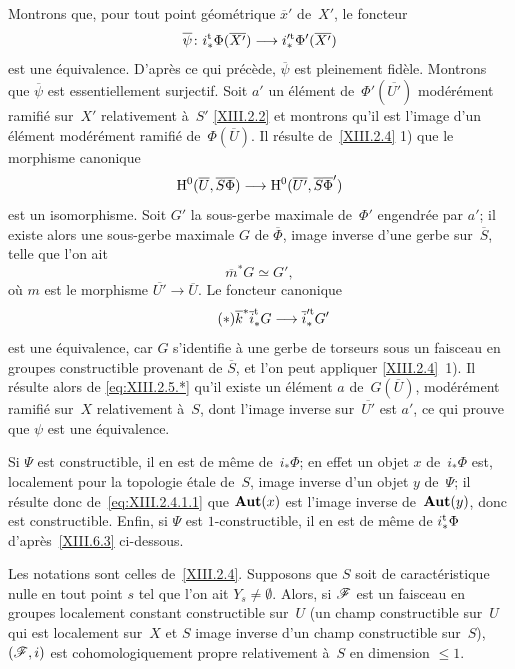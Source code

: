 Montrons
que, pour tout point g\'eom\'etrique $\overline{x}'$ de~$X'$, le
foncteur
$$
\overline{\psi}\colon i^{\tame}_*\Phi(\overline{X'})\to
i_*^{\prime\tame}\Phi'(\overline{X'})
$$
est une \'equivalence. D'apr\`es ce qui pr\'ec\`ede,
$\overline{\psi}$ est pleinement fid\`ele. Montrons que
$\overline{\psi}$ est essentiellement surjectif. Soit $a'$ un
\'el\'ement de~$\Phi'(\overline{U'})$ mod\'er\'ement
ramifi\'e sur~$X'$ relativement \`a~$S'$ \eqref{XIII.2.2} et
montrons qu'il est l'image d'un \'el\'ement mod\'er\'ement
ramifi\'e de~$\Phi(\overline{U})$. Il r\'esulte de~\ref{XIII.2.4}
1) que le morphisme canonique
$$
\H^0(\overline{U},\overline{S}\overline{\Phi})\to
\H^0(\overline{U'},\overline{S}\overline{\Phi}')
$$
est un isomorphisme. Soit $G'$ la sous-gerbe maximale de~$\Phi'$
engendr\'ee par $a'$; il existe alors une sous-gerbe maximale $G$ de
$\overline{\Phi}$, image inverse d'une gerbe sur~$\overline{S}$, telle
que l'on ait
$$
\overline{m}^*G\simeq G',
$$
o\`u $m$ est le morphisme $\overline{U'}\to
\overline{U}$. Le foncteur canonique
\begin{equation*}
\label{eq:XIII.2.5.*}
\tag{$*$} {\overline{k}^*\overline{i}_*^{\tame}G\to
\overline{i}_*^{\prime\tame}G'}
\end{equation*}
est une \'equivalence, car $G$ s'identifie \`a une gerbe de
torseurs sous un faisceau en groupes constructible provenant de
$\overline{S}$, et l'on peut appliquer \ref{XIII.2.4}~1). Il
r\'esulte alors de \eqref{eq:XIII.2.5.*} qu'il existe un
\'el\'ement $a$ de~$G(\overline{U})$, mod\'er\'ement
ramifi\'e sur~$X$ relativement \`a~$S$, dont l'image inverse sur~$\overline{U'}$ est $a'$, ce qui prouve que $\psi$ est une
\'equivalence.

Si $\Psi$ est constructible, il en est de m\^eme de~$i_*\Phi$; en
effet un objet $x$ de~$i_*\Phi$ est, localement pour la topologie
\'etale de~$S$, image inverse d'un objet $y$ de~$\Psi$; il
r\'esulte donc de~\ref{eq:XIII.2.4.1.1} que $\operatorname{\mathbf{Aut}} (x)$ est
l'image inverse de~$\operatorname{\mathbf{Aut}} (y)$, donc est constructible. Enfin, si
$\Psi$ est $1$-constructible, il en est de m\^eme de
$i^{\mathrm{t}}_*\Phi$ d'apr\`es~\ref{XIII.6.3} ci-dessous.

\begin{corollaire}
\label{XIII.2.6}
Les
notations sont celles de~\ref{XIII.2.4}. Supposons que $S$ soit de
caract\'eristique nulle en tout point $s$ tel que l'on ait $Y_s\neq
\emptyset.$ Alors, si $\cal{ F}$ est un faisceau en groupes localement
constant constructible sur~$U$ (\resp un champ constructible sur~$U$ qui
est localement sur~$X$ et $S$ image inverse d'un champ constructible
sur~$S$), $(\cal{ F},i)$ est cohomologiquement propre relativement
\`a~$S$ en dimension $\leq 1.$
\end{corollaire}


